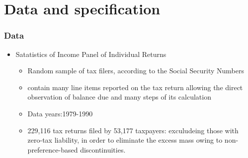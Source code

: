 \documentclass[dvipdfmx,12pt]{beamer}
\begin{document}
\section{Data and specification}
\begin{frame}\frametitle{Data}
  \begin{itemize}
    \item Satatistics of Income Panel of Individual Returns

    \begin{itemize}
      \item Random sample of tax filers, according to the Social Security
      Numbers

      \item contain many line items reported on the tax return allowing
      the direct observation of balance due and many steps of its calculation

      \item Data years:1979-1990

      \item 229,116 tax returns filed by 53,177 taxpayers:
      exculudeing those with zero-tax liability, in order to eliminate
      the excess mass owing to non-preference-based discontinuities.
    \end{itemize}
  \end{itemize}
\end{frame}
\end{document}
